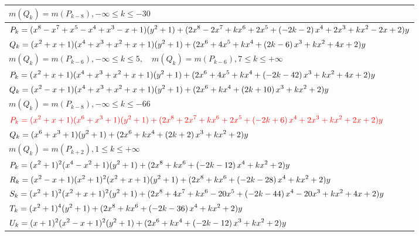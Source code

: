 \documentclass{amsart}
\begin{document}
\begin{longtable}{|l|}
\(\displaystyle m(Q_k) = m(P_{k
 - 8}),-\infty \leqslant k \leqslant -30\)\\
\hline
\(\displaystyle P_k=(x^8
 - x^7
 + x^5
 - x^4
 + x^3
 - x
 + 1)(y^2+1)+(2\*x^8
 - 2\*x^7
 + k\*x^6
 + 2\*x^5
 + \left(-2\*k
 - 2\right) \*x^4
 + 2\*x^3
 + k\*x^2
 - 2\*x
 + 2)y\)\\
\(\displaystyle Q_k=(x^2
 + x
 + 1)(x^4
 + x^3
 + x^2
 + x
 + 1)(y^2+1)+(2\*x^6
 + 4\*x^5
 + k\*x^4
 + \left(2\*k
 - 6\right) \*x^3
 + k\*x^2
 + 4\*x
 + 2)y\)\\
\(\displaystyle m(Q_k) = m(P_{k
 - 6}),-\infty \leqslant k \leqslant 5,\quad m(Q_k) = m(P_{k
 - 6}),7 \leqslant k \leqslant +\infty\)\\
\hline
\(\displaystyle P_k=(x^2
 + x
 + 1)(x^4
 + x^3
 + x^2
 + x
 + 1)(y^2+1)+(2\*x^6
 + 4\*x^5
 + k\*x^4
 + \left(-2\*k
 - 42\right) \*x^3
 + k\*x^2
 + 4\*x
 + 2)y\)\\
\(\displaystyle Q_k=(x^2
 - x
 + 1)(x^4
 + x^3
 + x^2
 + x
 + 1)(y^2+1)+(2\*x^6
 + k\*x^4
 + \left(2\*k
 + 10\right) \*x^3
 + k\*x^2
 + 2)y\)\\
\(\displaystyle m(Q_k) = m(P_{k
 - 8}),-\infty \leqslant k \leqslant -66\)\\
\hline
\(\displaystyle 
\red{
P_k=(x^2
 + x
 + 1)(x^6
 + x^3
 + 1)(y^2+1)+(2\*x^8
 + 2\*x^7
 + k\*x^6
 + 2\*x^5
 + \left(-2\*k
 + 6\right) \*x^4
 + 2\*x^3
 + k\*x^2
 + 2\*x
 + 2)y
 }
 \)\\
\(\displaystyle Q_k=(x^6
 + x^3
 + 1)(y^2+1)+(2\*x^6
 + k\*x^4
 + \left(2\*k
 + 2\right) \*x^3
 + k\*x^2
 + 2)y\)\\
\(\displaystyle m(Q_k) = m(P_{k
 + 2}),1 \leqslant k \leqslant +\infty\)\\
\hline
\(\displaystyle P_k=(x^2
 + 1)^{2}(x^4
 - x^2
 + 1)(y^2+1)+(2\*x^8
 + k\*x^6
 + \left(-2\*k
 - 12\right) \*x^4
 + k\*x^2
 + 2)y\)\\
\(\displaystyle R_k=(x^2
 - x
 + 1)(x^2
 + 1)^{2}(x^2
 + x
 + 1)(y^2+1)+(2\*x^8
 + k\*x^6
 + \left(-2\*k
 - 28\right) \*x^4
 + k\*x^2
 + 2)y\)\\
\(\displaystyle S_k=(x^2
 + 1)^{2}(x^2
 + x
 + 1)^{2}(y^2+1)+(2\*x^8
 + 4\*x^7
 + k\*x^6
 - 20\*x^5
 + \left(-2\*k
 - 44\right) \*x^4
 - 20\*x^3
 + k\*x^2
 + 4\*x
 + 2)y\)\\
\(\displaystyle T_k=(x^2
 + 1)^{4}(y^2+1)+(2\*x^8
 + k\*x^6
 + \left(-2\*k
 - 36\right) \*x^4
 + k\*x^2
 + 2)y\)\\
\(\displaystyle U_k=(x
 + 1)^{2}(x^2
 - x
 + 1)^{2}(y^2+1)+(2\*x^6
 + k\*x^4
 + \left(-2\*k
 - 12\right) \*x^3
 + k\*x^2
 + 2)y\)\\

\end{longtable}
\end{document}
